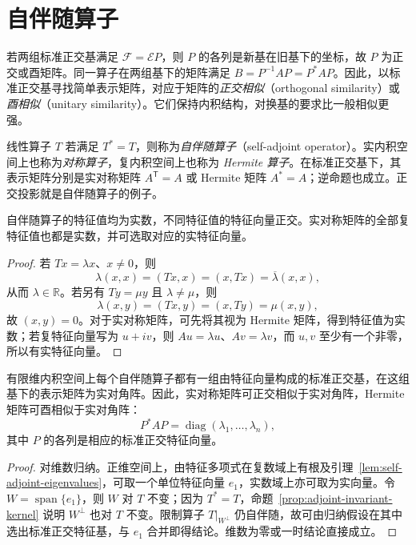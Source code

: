 \section{自伴随算子}
\label{sec:self-adjoint}

若两组标准正交基满足 $\mathcal F=\mathcal E P$，则 $P$ 的各列是新基在旧基下的坐标，故 $P$ 为正交或酉矩阵。同一算子在两组基下的矩阵满足 $B=P^{-1}AP=P^*AP$。因此，以标准正交基寻找简单表示矩阵，对应于矩阵的\emph{正交相似}（orthogonal similarity）或\emph{酉相似}（unitary similarity）。它们保持内积结构，对换基的要求比一般相似更强。

\begin{definition}
线性算子 $T$ 若满足 $T^*=T$，则称为\emph{自伴随算子}（self-adjoint operator）。实内积空间上也称为\emph{对称算子}，复内积空间上也称为 \emph{Hermite 算子}。在标准正交基下，其表示矩阵分别是实对称矩阵 $A^{\mathsf T}=A$ 或 Hermite 矩阵 $A^*=A$；逆命题也成立。正交投影就是自伴随算子的例子。
\end{definition}

\begin{lemma}
\label{lem:self-adjoint-eigenvalues}
自伴随算子的特征值均为实数，不同特征值的特征向量正交。实对称矩阵的全部复特征值也都是实数，并可选取对应的实特征向量。
\end{lemma}
\begin{proof}
若 $Tx=\lambda x$、$x\ne0$，则
\[
    \lambda(x,x)=(Tx,x)=(x,Tx)=\overline\lambda(x,x),
\]
从而 $\lambda\in\mathbb R$。若另有 $Ty=\mu y$ 且 $\lambda\ne\mu$，则
\[
    \lambda(x,y)=(Tx,y)=(x,Ty)=\mu(x,y),
\]
故 $(x,y)=0$。对于实对称矩阵，可先将其视为 Hermite 矩阵，得到特征值为实数；若复特征向量写为 $u+iv$，则 $Au=\lambda u$、$Av=\lambda v$，而 $u,v$ 至少有一个非零，所以有实特征向量。
\end{proof}

\begin{theorem}[自伴随算子的标准型]
\label{thm:self-adjoint-diagonalization}
有限维内积空间上每个自伴随算子都有一组由特征向量构成的标准正交基，在这组基下的表示矩阵为实对角阵。因此，实对称矩阵可正交相似于实对角阵，Hermite 矩阵可酉相似于实对角阵：
\[
    P^*AP=\operatorname{diag}(\lambda_1,\ldots,\lambda_n),
\]
其中 $P$ 的各列是相应的标准正交特征向量。
\end{theorem}
\begin{proof}
对维数归纳。正维空间上，由特征多项式在复数域上有根及引理~\ref{lem:self-adjoint-eigenvalues}，可取一个单位特征向量 $e_1$，实数域上亦可取为实向量。令 $W=\operatorname{span}\{e_1\}$，则 $W$ 对 $T$ 不变；因为 $T^*=T$，命题~\ref{prop:adjoint-invariant-kernel} 说明 $W^\perp$ 也对 $T$ 不变。限制算子 $T|_{W^\perp}$ 仍自伴随，故可由归纳假设在其中选出标准正交特征基，与 $e_1$ 合并即得结论。维数为零或一时结论直接成立。
\end{proof}

